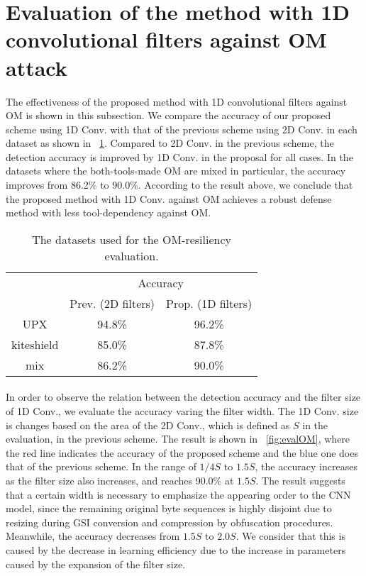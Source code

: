 \section{Evaluation of the method with 1D convolutional filters against OM attack}
The effectiveness of the proposed method with 1D convolutional filters against OM is shown in this subsection.
We compare the accuracy of our proposed scheme using 1D Conv. with that of the previous scheme using 2D Conv. in each dataset as shown in \tablename~\ref{tab:evalOM}.
Compared to 2D Conv. in the previous scheme, the detection accuracy is improved by 1D Conv. in the proposal for all cases.
In the datasets where the both-tools-made OM are mixed in particular, the accuracy improves from 86.2\% to 90.0\%.
According to the result above, we conclude that the proposed method with 1D Conv. against OM achieves a robust defense method with less tool-dependency against OM.
\begin{table}[h]
  \begin{center}
    \caption{The datasets used for the OM-resiliency evaluation.}
    \label{tab:evalOM} 
    \begin{tabular}{|c|c|c|} \hline
      \multirow{2}{*}{\hfill  \hfill} & \multicolumn{2}{c|}{Accuracy}  \\ \cline{2-3} 
					     & Prev. (2D filters) & Prop. (1D filters) \\ \hline \hline
      UPX & 94.8\% & 96.2\% \\ \cline{1-3} 
      kiteshield & 85.0\% & 87.8\% \\ \cline{1-3} 
      mix & 86.2\% & 90.0\% \\ \cline{1-3} 
  \end{tabular}
  \end{center}
\end{table}

\paragraph{}
In order to observe the relation between the detection accuracy and the filter size of 1D Conv., we evaluate the accuracy varing the filter width.
The 1D Conv. size is changes based on the area of the 2D Conv., which is defined as $S$ in the evaluation, in the previous scheme.
The result is shown in \figurename~\ref{fig:evalOM}, where the red line indicates the accuracy of the proposed scheme and the blue one does that of the previous scheme.
In the range of $1/4S$ to $1.5S$, the accuracy increases as the filter size also increases, and reaches 90.0\% at $1.5S$.
The result suggests that a certain width is necessary to emphasize the appearing order to the CNN model, since the remaining original byte sequences is highly disjoint due to resizing during GSI conversion and compression by obfuscation procedures.
Meanwhile, the accuracy decreases from $1.5S$ to $2.0S$.
We consider that this is caused by the decrease in learning efficiency due to the increase in parameters caused by the expansion of the filter size.

